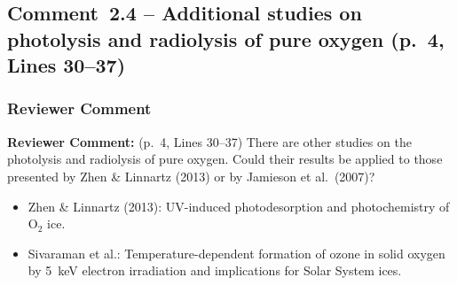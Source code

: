 \documentclass[12pt]{article}
\newcommand{\reviewlabel}{\textbf{\textcolor{commentframe}{Reviewer Comment:}}}
\begin{document}
\subsection{Comment~2.4 -- Additional studies on photolysis and radiolysis of pure oxygen (p.~4, Lines 30--37)}

\subsubsection{Reviewer Comment}
\begin{reviewerbox}
\reviewlabel{} (p.~4, Lines 30--37) There are other studies on the photolysis
and radiolysis of pure oxygen. Could their results be applied to those
presented by Zhen \& Linnartz (2013) or by Jamieson et al.\ (2007)?
\begin{itemize}[nosep]
  \item Zhen \& Linnartz (2013): UV-induced photodesorption and photochemistry
        of O$_2$ ice.
  \item Sivaraman et al.: Temperature-dependent formation of ozone in solid
        oxygen by 5~keV electron irradiation and implications for Solar System
        ices.
\end{itemize}
\end{reviewerbox}
\end{document}
